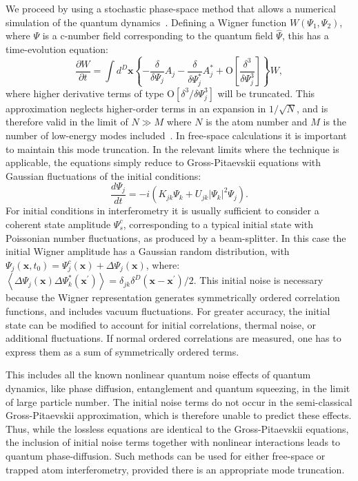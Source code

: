 \documentclass[aps,prl,twocolumn,showpacs,amsmath,amssymb,superscriptaddress,flushbottom,noraggedfooter]{revtex4-1}
\newcommand{\xvec}{\boldsymbol{x}}
\newcommand{\Psivec}{\boldsymbol{\Psi}}
\begin{document}
We proceed by using a stochastic phase-space method that allows a numerical
simulation of the quantum dynamics~\cite{Drummond1993,Steel1998,Hoffmann2008}.
Defining a Wigner function $W(\Psi_1, \Psi_2)$, where $\Psi$
is a c-number field corresponding to the quantum field $\hat{\Psi}$, this has a time-evolution equation:
\begin{equation}
	\frac{\partial W}{\partial t} = \int d^D\xvec \left\{
		- \frac{\delta}{\delta\Psi_j} A_j
		- \frac{\delta}{\delta\Psi_j^*}A_j^*
		+ \mbox{O} \left[ \frac{\delta^3}{\delta\Psi_j^3} \right]
	\right\} W,
\end{equation}
where higher derivative terms of type $\mbox{O} \left[ \delta^3 / \delta\Psi_j^3 \right]$ will be truncated.
This approximation neglects higher-order terms in an expansion in $1 / \sqrt{N}$,
and is therefore valid in the limit of $N \gg M$
where $N$ is the atom number and $M$ is the number of low-energy modes included~\cite{Drummond1993,Sinatra2002,Norrie2006}.
In free-space calculations it is important to maintain this mode truncation.
In the relevant limits where the technique is applicable, the equations
simply reduce to Gross-Pitaevskii equations with Gaussian fluctuations
of the initial conditions:
\begin{equation}
\label{eqn:SDE-1}
	\frac{d\Psi_j}{dt} = -i \left(
		K_{jk} \Psi_k + U_{jk} \lvert \Psi_k \rvert^2 \Psi_j
	\right).
\end{equation}
For initial conditions in interferometry it is usually sufficient to consider
a coherent state amplitude $\Psi_s^c$,
corresponding to a typical initial state with Poissonian number fluctuations,
as produced by a beam-splitter.
In this case the initial Wigner amplitude has a Gaussian random distribution, with
$\Psi_j(\xvec, t_0) = \Psi_j^c(\xvec) + \Delta \Psi_j(\xvec)$, where:
$\left\langle \Delta \Psi_j(\xvec) \Delta \Psi_k^*(\xvec^{\prime}) \right\rangle =
\delta_{jk} \delta^D(\xvec - \xvec^{\prime}) / 2.$
This initial noise is necessary because the Wigner representation generates
symmetrically ordered correlation functions, and includes vacuum fluctuations.
For greater accuracy, the initial state can be modified to account for
initial  correlations, thermal noise, or additional fluctuations.
If normal ordered correlations are measured, one has to express them
as a sum of symmetrically ordered terms.

This includes all the known nonlinear quantum noise effects of quantum dynamics,
like phase diffusion, entanglement and quantum squeezing, in the limit
of large particle number.
The initial noise terms do not occur in the semi-classical Gross-Pitaevskii
approximation, which is therefore unable to predict these effects.
Thus, while the lossless equations are identical to the Gross-Pitaevskii
equations, the inclusion of initial noise terms together with nonlinear
interactions leads to quantum phase-diffusion.
Such methods can be used for either free-space or trapped atom interferometry,
provided there is an appropriate mode truncation.
\end{document}
